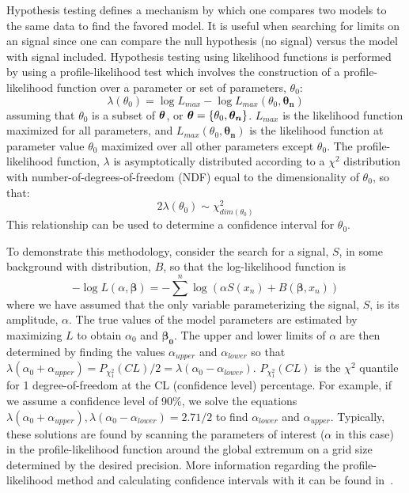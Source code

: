 Hypothesis testing defines a mechanism by which one compares two models to the same data to find the favored model.  It is useful when searching for limits on an signal since one can compare the null hypothesis (no signal) versus the model with signal included.  Hypothesis testing using likelihood functions is performed by using a profile-likelihood test which involves the construction of a profile-likelihood function over a parameter or set of parameters, $\theta_{0}$:
		\[
		\lambda(\theta_{0}) = \log L_{max}  - \log L_{max}(\theta_{0}, \boldsymbol{\theta_{n}})
		\]
assuming that $\theta_{0}$ is a subset of $\boldsymbol{\theta}$, or $\boldsymbol{\theta} = \{\theta_{0}, \boldsymbol{\theta_{n}}\}$.  $L_{max}$ is the likelihood function maximized for all parameters, and $ L_{max}(\theta_{0}, \boldsymbol{\theta_{n}})$ is the likelihood function at parameter value $\theta_{0}$ maximized over all other parameters except $\theta_{0}$.  The profile-likelihood function, $\lambda$ is asymptotically distributed according to a $\chi^{2}$ distribution with number-of-degrees-of-freedom (NDF) equal to the dimensionality of $\theta_{0}$, so that:
		\[
		2 \lambda (\theta_{0}) \sim \chi^{2}_{dim(\theta_{0})}
		\]
  This relationship can be used to determine a confidence interval for $\theta_{0}$.		

To demonstrate this methodology, consider the search for a signal, $S$, in some background with distribution, $B$, so that the log-likelihood function is
		\[
		-\log L (\alpha, \boldsymbol{\beta}) = -\sum^{n} \log (\alpha S (x_{n}) + B(\boldsymbol{\beta}, x_{n}))
		\]
where we have assumed that the only variable parameterizing the signal, $S$, is its amplitude, $\alpha$.  The true values of the model parameters are estimated by maximizing $L$ to obtain $\alpha_{0}$ and $\boldsymbol{\beta_{0}}$.  The upper and lower limits of $\alpha$ are then determined by finding the values $\alpha_{upper}$ and $\alpha_{lower}$ so that $\lambda(\alpha_{0} + \alpha_{upper}) =  P_{\chi^{2}_{1}} (CL)/2 = \lambda(\alpha_{0} - \alpha_{lower})$.  $P_{\chi^{2}_{1}} (CL)$ is the $\chi^{2}$ quantile for 1 degree-of-freedom at the CL (confidence level) percentage.  For example, if we assume a confidence level of 90\%, we solve the equations $\lambda(\alpha_{0} + \alpha_{upper}), \lambda(\alpha_{0} - \alpha_{lower}) = 2.71/2$ to find $\alpha_{lower}$ and $\alpha_{upper}$.  Typically, these solutions are found by scanning the parameters of interest  ($\alpha$ in this case) in the profile-likelihood function around the global extremum on a grid size determined by the desired precision.  More information regarding the profile-likelihood method and calculating confidence intervals with it can be found in~\cite{Venz1988}.

